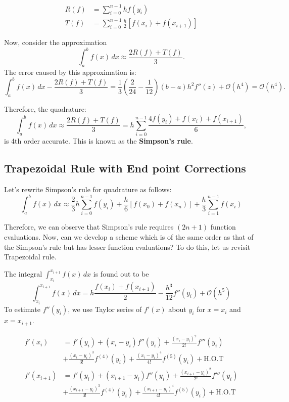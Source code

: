 \documentclass[
]{book}
\begin{document}
\begin{align}
R(f) &= \sum_{i=0}^{n-1}hf(y_i)\\
T(f) &= \sum_{i=0}^{n-1}\frac{h}{2}[f(x_i)+f(x_{i+1})]
\end{align}

Now, consider the approximation
\[\int_a^b f(x)\, dx  \approx \frac{2R(f) + T(f)}{3}.\]
The error caused by this approximation is:
\[ \int_a^bf(x)\, dx - \frac{2R(f) + T(f)}{3} = \frac{1}{3} \left(\frac{2}{24}-\frac{1}{12} \right) (b-a)h^2f''(z) + \mathcal{O}(h^4) = \mathcal{O}(h^4).\]

Therefore, the quadrature:
\begin{equation}
\int_a^b f(x)\, dx  \approx \frac{2R(f) + T(f)}{3} = h\sum_{i=0}^{n-1}\frac{4f(y_i)+f(x_i)+f(x_{i+1})}{6},
\end{equation}
is 4th order accurate. This is known as the \textbf{Simpson's rule}.

\hypertarget{trapezoidal-rule-with-end-point-corrections}{%
\subsection{Trapezoidal Rule with End point Corrections}\label{trapezoidal-rule-with-end-point-corrections}}

Let's rewrite Simpson's rule for quadrature as follows:
\[\int_a^b f(x)\, dx  \approx \frac{2}{3}h \sum_{i=0}^{n-1}f(y_i)+\frac{h}{6}[f(x_0)+f(x_n)]+\frac{h}{3}\sum_{i=1}^{n-1}f(x_i)\]

Therefore, we can observe that Simpson's rule requires \((2n+1)\) function evaluations. Now, can we develop a scheme which is of the same order as that of the Simpson's rule but has lesser function evaluations? To do this, let us revisit Trapezoidal rule.

The integral \(\int_{x_i}^{x_{i+1}}f(x)\, dx\) is found out to be
\[\int_{x_i}^{x_{i+1}} f(x)\,dx = h \frac{f(x_i)+f(x_{i+1})}{2}  -\frac{h^3}{12}f''(y_i)+\mathcal{O}(h^5)\]
To estimate \(f''(y_i)\), we use Taylor series of \(f'(x)\) about \(y_i\) for \(x=x_i\) and \(x=x_{i+1}\).

\begin{align*}
f'(x_i) &= f'(y_i) + (x_i-y_i)f''(y_i)+ \frac{(x_i-y_i)^2}{2!}f'''(y_i) \\
        &+\frac{(x_i-y_i)^3}{3!}f^{(4)}(y_i) + \frac{(x_i-y_i)^4}{4!}f^{(5)}(y_i)+ \text{H.O.T}\\
f'(x_{i+1}) &= f'(y_i) + (x_{i+1}-y_i)f''(y_i)+ \frac{(x_{i+1}-y_i)^2}{2!}f'''(y_i) \\
            &+\frac{(x_{i+1}-y_i)^3}{3!}f^{(4)}(y_i) + \frac{(x_{i+1}-y_i)^4}{4!}f^{(5)}(y_i) + \text{H.O.T}        
\end{align*}
\end{document}
